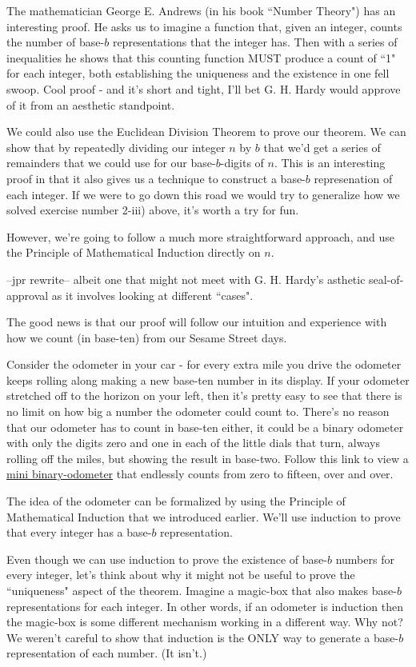 \documentclass{article}
\begin{document}
The mathematician George E. Andrews (in his book
``Number Theory") has an interesting proof.
He asks us to imagine a function that, given an integer,
counts the number of base-$b$ representations that the integer has.
Then with a series of inequalities he shows that this counting function
MUST produce a count of ``1" for each integer, both establishing the uniqueness 
and the existence in one fell swoop.
Cool proof - and it's short and tight, I'll bet G. H. Hardy would approve of
it from an aesthetic standpoint.

We could also use the Euclidean Division Theorem to prove our
theorem.
We can show that by repeatedly dividing our integer $n$ by $b$
that we'd get a series of remainders that we could use for our base-$b$-digits of $n$.
This is an interesting proof in that it also gives us a technique
to construct a base-$b$ represenation of each integer.
If we were to go down this road
we would try to generalize how we solved
exercise number 2-iii) above, it's worth a try for fun.

However, we're going to follow a much more straightforward approach,
and use the Principle of Mathematical Induction directly on $n$.

--jpr rewrite--
albeit one that might not meet with G. H. Hardy's asthetic seal-of-approval
as it involves looking at different ``cases".

The good news is that our proof will follow our intuition and experience with
how we count (in base-ten) from our Sesame Street days.

Consider the odometer in your car - for every extra mile
you drive the odometer keeps rolling along
making a new base-ten number in its display.
If your odometer stretched off to the horizon on your left,
then it's pretty easy to see that there is
no limit on how big a number the odometer could count to.
There's no reason that our odometer has to count in base-ten either,
it could be a binary odometer with only the digits zero and one in each of the 
little dials that turn, always
rolling off the miles, but showing the result in base-two.
Follow this link to view a
\href{http://www.orangeimagination.com/jprBinaryOdometer.gif}{mini binary-odometer}
that endlessly counts from zero to fifteen, over and over.

The idea of the odometer can be formalized by using
the Principle of Mathematical Induction that we introduced earlier.
We'll use induction to prove that every integer has a base-$b$ representation.

Even though we can use induction to prove the existence of base-$b$
numbers for every integer, let's think about why it
might not be useful to prove the ``uniqueness" aspect of 
the theorem.
Imagine a magic-box
that also makes base-$b$ representations for each
integer.
In other words, if an odometer is induction then the magic-box
is some different mechanism working in a different way.
Why not? We weren't careful to show that induction is the ONLY way
to generate a base-$b$ representation of each number. (It isn't.)
\end{document}

